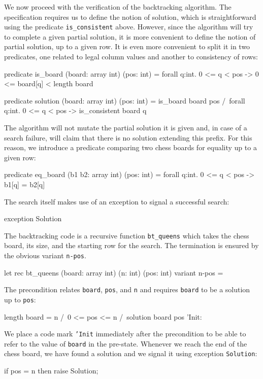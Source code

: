 We now proceed with the verification of the backtracking algorithm.
The specification requires us to define the notion of solution, which
is straightforward using the predicate \verb|is_consistent| above.
However, since the algorithm will try to complete a given partial
solution, it is more convenient to define the notion of partial
solution, up to a given row. It is even more convenient to split it in
two predicates, one related to legal column values and another to
consistency of rows:
\begin{whycode}
  predicate is_board (board: array int) (pos: int) =
    forall q:int. 0 <= q < pos -> 0 <= board[q] < length board

  predicate solution (board: array int) (pos: int) =
    is_board board pos /\
    forall q:int. 0 <= q < pos -> is_consistent board q
\end{whycode}
The algorithm will not mutate the partial solution it is given and,
in case of a search failure, will claim that there is no solution
extending this prefix. For this reason, we introduce a predicate
comparing two chess boards for equality up to a given row:
\begin{whycode}
  predicate eq_board (b1 b2: array int) (pos: int) =
    forall q:int. 0 <= q < pos -> b1[q] = b2[q]
\end{whycode}
The search itself makes use of an exception to signal a successful search:
\begin{whycode}
  exception Solution
\end{whycode}
The backtracking code is a recursive function \verb|bt_queens| which
takes the chess board, its size, and the starting row for the search.
The termination is ensured by the obvious variant \texttt{n-pos}.
\begin{whycode}
  let rec bt_queens (board: array int) (n: int) (pos: int) 
                    variant {n-pos} =
\end{whycode}
The precondition relates \texttt{board}, \texttt{pos}, and \texttt{n}
and requires \texttt{board} to be a solution up to \texttt{pos}:
\begin{whycode}
    { length board = n /\ 0 <= pos <= n /\ solution board pos }
    'Init:
\end{whycode}
We place a code mark \texttt{'Init} immediately after the precondition to
be able to refer to the value of \texttt{board} in the pre-state.
Whenever we reach the end of the chess board, we have found a solution
and we signal it using exception \texttt{Solution}:
\begin{whycode}
    if pos = n then raise Solution;
\end{whycode}
